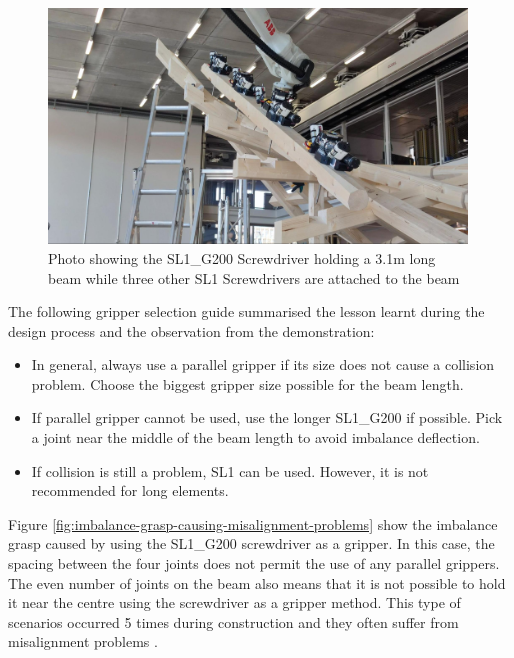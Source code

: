 \begin{figure}[!h]
    \centering
    \includegraphics[width=0.99\textwidth]{images/7b/img28.jpg}
    \caption{Photo showing the SL1\_G200 Screwdriver holding a 3.1m long beam while three other SL1 Screwdrivers are attached to the beam}
    \label{fig:3point1-meter-screwed-beam}
\end{figure}


The following gripper selection guide summarised the lesson learnt during the design process and the observation from the demonstration:

\begin{itemize}
    \item In general, always use a parallel gripper if its size does not cause a collision problem. Choose the biggest gripper size possible for the beam length.
    \item If parallel gripper cannot be used, use the longer SL1\_G200 if possible. Pick a joint near the middle of the beam length to avoid imbalance deflection.
    \item If collision is still a problem, SL1 can be used. However, it is not recommended for long elements.
\end{itemize}

Figure \ref{fig:imbalance-grasp-causing-misalignment-problems} show the imbalance grasp caused by using the SL1\_G200 screwdriver as a gripper. In this case, the spacing between the four joints does not permit the use of any parallel grippers. The even number of joints on the beam also means that it is not possible to hold it near the centre using the screwdriver as a gripper method. This type of scenarios occurred 5 times during construction and they often suffer from misalignment problems .

